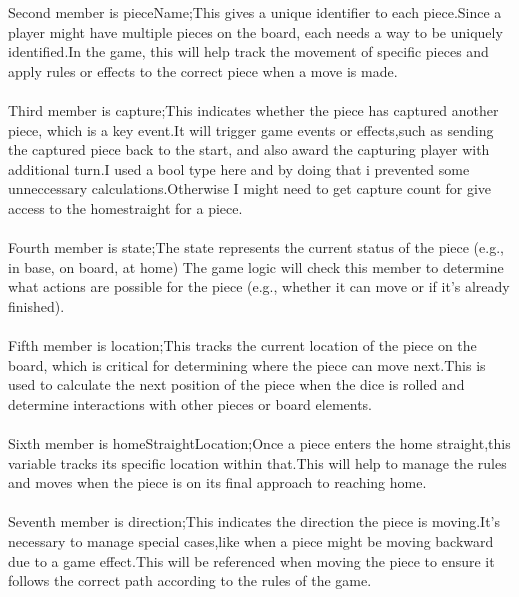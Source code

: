 \documentclass[a4paper,12pt]{article}
\begin{document}
\begin{enumerate}
Second member is pieceName;This gives a unique identifier to each piece.Since a player might have multiple pieces on the board, each needs a way to be uniquely identified.In the game, this will help track the movement of specific pieces and apply rules or effects to the correct piece when a move is made.\\ \\

Third member is capture;This indicates whether the piece has captured another piece, which is a key event.It will trigger game events or effects,such as sending the captured piece back to the start, and also award the capturing player with additional turn.I used a bool type here and by doing that i prevented some unneccessary calculations.Otherwise I  might need to get capture count for give access to the homestraight for a piece.\\ \\

Fourth member is state;The state represents the current status of the piece (e.g., in base, on board, at home) The game logic will check this member to determine what actions are possible for the piece (e.g., whether it can move or if it's already finished).\\ \\

Fifth member is location;This tracks the current location of the piece on the board, which is critical for determining where the piece can move next.This is used to calculate the next position of the piece when the dice is rolled and determine interactions with other pieces or board elements.\\ \\

Sixth member is homeStraightLocation;Once a piece enters the home straight,this variable tracks its specific location within that.This will help to manage the rules and moves when the piece is on its final approach to reaching home.\\ \\

Seventh member is direction;This indicates the direction the piece is moving.It’s necessary to manage special cases,like when a piece might be moving backward due to a game effect.This will be referenced when moving the piece to ensure it follows the correct path according to the rules of the game.\\ \\




\end{enumerate}
\end{document}
